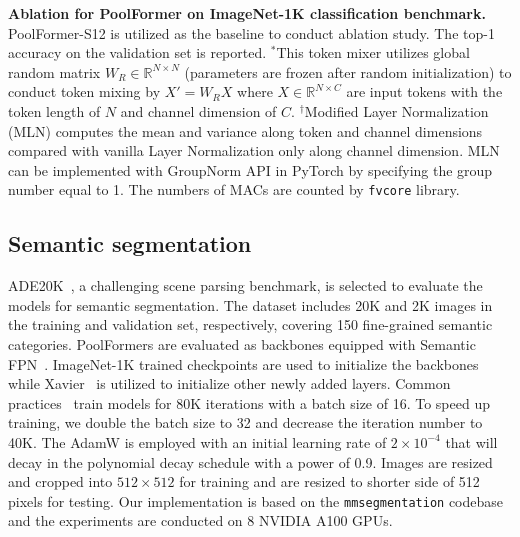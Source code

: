 \begin{table}[t]
\small
\centering
\setlength{\tabcolsep}{2pt}

\vspace{-3mm}
\caption{\textbf{Ablation for PoolFormer on ImageNet-1K classification benchmark.} PoolFormer-S12 is utilized as the baseline to conduct ablation study. The top-1 accuracy on the validation set is reported. $^*$This token mixer utilizes global random matrix $W_R\in \mathbb{R}^{N\times N}$ (parameters are frozen after random initialization) to conduct token mixing by $X'=W_RX$ where $X\in \mathbb{R}^{N \times C}$ are input tokens with the token length of $N$ and channel dimension of $C$. $^\dag$Modified Layer Normalization (MLN) computes the mean and variance along token and channel dimensions compared with vanilla Layer Normalization only along channel dimension. MLN can be implemented with GroupNorm API in PyTorch by specifying the group number equal to 1. The numbers of MACs are counted by \texttt{fvcore} \cite{fvcore} library.
}
\label{tab:ablation}
\normalsize
\vspace{-2mm}
\end{table}


\vspace{-1pt}
\subsection{Semantic segmentation}
\vspace{-3pt}
ADE20K~\cite{ade20k}, a challenging scene parsing benchmark, is selected to evaluate the models for semantic segmentation. The dataset includes 20K and 2K images in the training and validation set, respectively, covering 150 fine-grained semantic categories. PoolFormers are evaluated as backbones equipped with Semantic FPN~\cite{fpn}. ImageNet-1K trained checkpoints are used to initialize the backbones while Xavier~\cite{glorot2010understanding} is utilized to initialize other newly added layers. Common practices~\cite{fpn,chen2017deeplab} train models for 80K iterations with a batch size of 16. To speed up training, we double the batch size to 32 and decrease the iteration number to 40K. The AdamW \cite{adam, adamw} is employed with an initial learning rate of $2\times 10^{-4}$ that will decay in the polynomial decay schedule with a power of 0.9. Images are resized and cropped into $512\times 512$ for training and are resized to shorter side of 512 pixels for testing. Our implementation is based on the \texttt{mmsegmentation} \cite{mmseg2020} codebase and the experiments are conducted on 8 NVIDIA A100 GPUs. 


